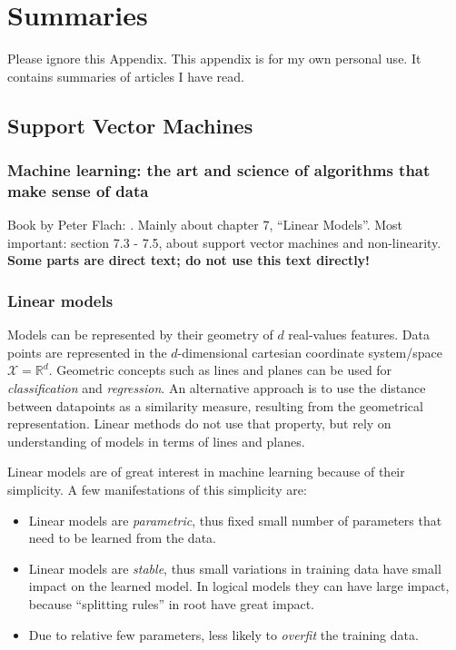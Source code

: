
\chapter{Summaries} %

\label{AppendixA} %


Please ignore this Appendix.
This appendix is for my own personal use.
It contains summaries of articles I have read.

\section{Support Vector Machines}

\subsection{Machine learning: the art and science of algorithms that make sense of data}
Book by Peter Flach: \cite{flach2012machine}.
Mainly about chapter 7, ``Linear Models''.
Most important: section 7.3 - 7.5, about support vector machines and non-linearity.
\textbf{Some parts are direct text; do not use this text directly!}

\subsection{Linear models}
Models can be represented by their geometry of $d$ real-values features.
Data points are represented in the $d$-dimensional cartesian coordinate system/space $\mathcal{X} = \mathbb{R}^d$.
Geometric concepts such as lines and planes can be used for \emph{classification} and \emph{regression}.
An alternative approach is to use the distance between datapoints as a similarity measure, resulting from the geometrical representation.
Linear methods do not use that property, but rely on understanding of models in terms of lines and planes.

Linear models are of great interest in machine learning because of their simplicity.
A few manifestations of this simplicity are:
\begin{itemize}
  \item Linear models are \emph{parametric}, thus fixed small number of parameters that need to be learned from the data.
  \item Linear models are \emph{stable}, thus small variations in training data have small impact on the learned model. In logical models they can have large impact, because ``splitting rules'' in root have great impact.
  \item Due to relative few parameters, less likely to \emph{overfit} the training data.
\end{itemize}

